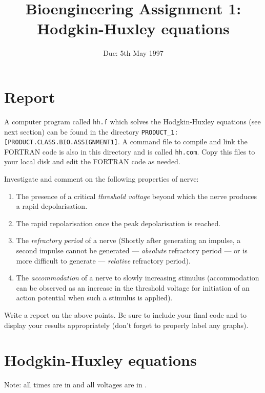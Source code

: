 \documentclass[12pt,dvips,fleqn]{article}
\title{Bioengineering Assignment 1: Hodgkin-Huxley equations}
\date{Due: 5th May 1997}
\begin{document}
\maketitle

\section{Report}

A computer program called \texttt{hh.f} which solves the Hodgkin-Huxley
equations (see next section) can be found in the directory
\texttt{PRODUCT\_1:[PRODUCT.CLASS.BIO.ASSIGNMENT1]}. A command file to compile
and link the FORTRAN code is also in this directory and is called
\texttt{hh.com}. Copy this files to your local disk and edit the FORTRAN code
as needed.

\vspace{\baselineskip}
\noindent Investigate and comment on the following properties of nerve:
\begin{enumerate}
\item The presence of a critical \emph{threshold voltage} beyond which the
  nerve produces a rapid depolarisation.
\item The rapid repolarisation once the peak depolarisation is reached.
\item The \emph{refractory period} of a nerve (Shortly after generating an
  impulse, a second impulse cannot be generated --- \emph{absolute} refractory
  period --- or is more difficult to generate --- \emph{relative} refractory
  period).
\item The \emph{accommodation} of a nerve to slowly increasing stimulus
  (accommodation can be observed as an increase in the threshold voltage for
  initiation of an action potential when such a stimulus is applied).
\end{enumerate}

\vspace{\baselineskip}
\noindent Write a report on the above points. Be sure to include your
final code and to display your results appropriately (\ie don't forget to
properly label any graphs).

\section{Hodgkin-Huxley equations}

Note: all times are in \ms and all voltages are in \mV.
\end{document}
